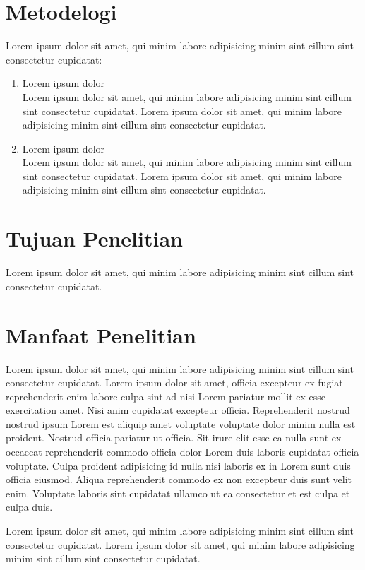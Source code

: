 \section{Metodelogi}
Lorem ipsum dolor sit amet, qui minim labore adipisicing minim sint cillum sint consectetur cupidatat:
\begin{enumerate}[noitemsep]
	\item Lorem ipsum dolor\\
	      Lorem ipsum dolor sit amet, qui minim labore adipisicing minim sint cillum sint consectetur cupidatat. Lorem ipsum dolor sit amet, qui minim labore adipisicing minim sint cillum sint consectetur cupidatat.
	\item Lorem ipsum dolor\\
	      Lorem ipsum dolor sit amet, qui minim labore adipisicing minim sint cillum sint consectetur cupidatat. Lorem ipsum dolor sit amet, qui minim labore adipisicing minim sint cillum sint consectetur cupidatat.
\end{enumerate}

\section{Tujuan Penelitian}
Lorem ipsum dolor sit amet, qui minim labore adipisicing minim sint cillum sint consectetur cupidatat.

\section{Manfaat Penelitian}
Lorem ipsum dolor sit amet, qui minim labore adipisicing minim sint cillum sint consectetur cupidatat. Lorem ipsum dolor sit amet, officia excepteur ex fugiat reprehenderit enim labore culpa sint ad nisi Lorem pariatur mollit ex esse exercitation amet. Nisi anim cupidatat excepteur officia. Reprehenderit nostrud nostrud ipsum Lorem est aliquip amet voluptate voluptate dolor minim nulla est proident. Nostrud officia pariatur ut officia. Sit irure elit esse ea nulla sunt ex occaecat reprehenderit commodo officia dolor Lorem duis laboris cupidatat officia voluptate. Culpa proident adipisicing id nulla nisi laboris ex in Lorem sunt duis officia eiusmod. Aliqua reprehenderit commodo ex non excepteur duis sunt velit enim. Voluptate laboris sint cupidatat ullamco ut ea consectetur et est culpa et culpa duis.

Lorem ipsum dolor sit amet, qui minim labore adipisicing minim sint cillum sint consectetur cupidatat. Lorem ipsum dolor sit amet, qui minim labore adipisicing minim sint cillum sint consectetur cupidatat.

